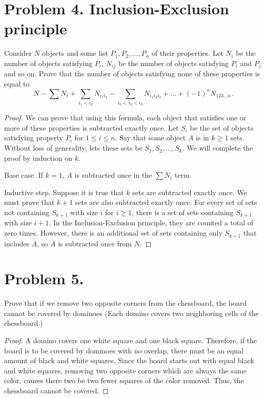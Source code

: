 \documentclass{article}
\begin{document}
\section{Problem 4. Inclusion-Exclusion principle}
Consider $N$ objects and some list $P_1,P_2,...,P_n$ of their properties. Let $N_i$ be the number of objects satisfying $P_i$, $N_{ij}$ be the number of objects satisfying $P_i$ and $P_j$ and so on. Prove that the number of objects satisfying none of these properties is equal to 
\[N-\sum N_i + \sum_{i_1<i_2} N_{i_1i_2} - \sum_{i_1<i_2<i_3} N_{i_1i_2i_3} +...+(-1)^nN_{123...n}.\]
\begin{proof}
We can prove that using this formula, each object that satisfies one or more of these properties is subtracted exactly once. Let $S_i$ be the set of objects satisfying property $P_i$ for $1\leq i\leq n$. Say that some object $A$ is in $k\geq 1$ sets. Without loss of generality, lets these sets be $S_1,S_2,\dots,S_k$. We will complete the proof by induction on $k$.
\par Base case. If $k=1$, $A$ is subtracted once in the $\sum N_i$ term.
\par Inductive step. Suppose it is true that $k$ sets are subtracted exactly once. We must prove that $k+1$ sets are also subtracted exactly once. For every set of sets not containing $S_{k+1}$ with size $i$ for $i\geq 1$, there is a set of sets containing $S_{k+1}$ with size $i+1$. In the Inclusion-Exclusion principle, they are counted a total of zero times. However, there is an additional set of sets containing only $S_{k+1}$ that includes $A$, so $A$ is subtracted once from $N$.
\end{proof}


\section{Problem 5.}
Prove that if we remove two opposite corners from the chessboard, the board cannot be covered by dominoes (Each domino covers two neighboring cells of the chessboard.)
\begin{proof}
A domino covers one white square and one black square. Therefore, if the board is to be covered by dominoes with no overlap, there must be an equal amount of black and white squares. Since the board starts out with equal black and white squares, removing two opposite corners which are always the same color, causes there two be two fewer squares of the color removed. Thus, the chessboard cannot be covered.
\end{proof}
\end{document}
